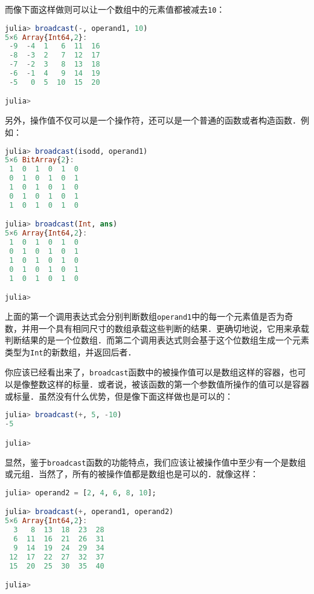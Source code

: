 而像下面这样做则可以让一个数组中的元素值都被减去\verb|10|：

\begin{lstlisting}[language=julia]
julia> broadcast(-, operand1, 10)
5×6 Array{Int64,2}:
 -9  -4  1   6  11  16
 -8  -3  2   7  12  17
 -7  -2  3   8  13  18
 -6  -1  4   9  14  19
 -5   0  5  10  15  20

julia> 
\end{lstlisting}

另外，操作值不仅可以是一个操作符，还可以是一个普通的函数或者构造函数．例如：

\begin{lstlisting}[language=julia]
julia> broadcast(isodd, operand1)
5×6 BitArray{2}:
 1  0  1  0  1  0
 0  1  0  1  0  1
 1  0  1  0  1  0
 0  1  0  1  0  1
 1  0  1  0  1  0

julia> broadcast(Int, ans)
5×6 Array{Int64,2}:
 1  0  1  0  1  0
 0  1  0  1  0  1
 1  0  1  0  1  0
 0  1  0  1  0  1
 1  0  1  0  1  0

julia> 
\end{lstlisting}

上面的第一个调用表达式会分别判断数组\verb|operand1|中的每一个元素值是否为奇数，并用一个具有相同尺寸的数组承载这些判断的结果．更确切地说，它用来承载判断结果的是一个位数组．而第二个调用表达式则会基于这个位数组生成一个元素类型为\verb|Int|的新数组，并返回后者．

你应该已经看出来了，\verb|broadcast|函数中的被操作值可以是数组这样的容器，也可以是像整数这样的标量．或者说，被该函数的第一个参数值所操作的值可以是容器或标量．虽然没有什么优势，但是像下面这样做也是可以的：

\begin{lstlisting}[language=julia]
julia> broadcast(+, 5, -10)
-5

julia> 
\end{lstlisting}

显然，鉴于\verb|broadcast|函数的功能特点，我们应该让被操作值中至少有一个是数组或元组．当然了，所有的被操作值都是数组也是可以的．就像这样：

\begin{lstlisting}[language=julia]
julia> operand2 = [2, 4, 6, 8, 10];

julia> broadcast(+, operand1, operand2)
5×6 Array{Int64,2}:
  3   8  13  18  23  28
  6  11  16  21  26  31
  9  14  19  24  29  34
 12  17  22  27  32  37
 15  20  25  30  35  40

julia> 
\end{lstlisting}

